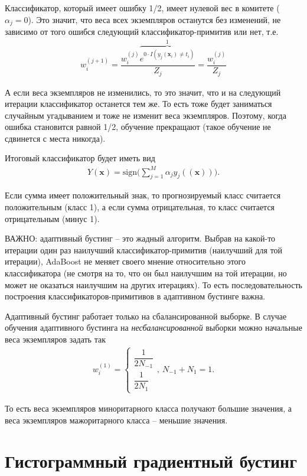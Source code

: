 \documentclass[%
	11pt,
	a4paper,
	utf8,
		]{article}
\begin{document}
Классификатор, который имеет ошибку 1/2, имеет нулевой вес в комитете ($ \alpha_j = 0 $). Это значит, что веса всех экземпляров останутся без изменений, не зависимо от того ошибся следующий классификатор-примитив или нет, т.е.
\begin{align*}
	w_i^{(j + 1)} = \dfrac{w_i^{(j)} \overbrace{e^{0\cdot I(y_j(\mathbf{x}_i) \neq t_i)}}^{1}}{Z_j} = \dfrac{ w_i^{(j)} }{Z_j}
\end{align*}

А если веса экземпляров не изменились, то это значит, что и на следующий итерации классификатор останется тем же. То есть тоже будет заниматься случайным угадыванием и тоже не изменит веса экземпляров. Поэтому, когда ошибка становится равной 1/2, обучение прекращают (такое обучение не сдвинется с места никогда).

Итоговый классификатор будет иметь вид
\begin{align*}
	Y(\mathbf{x}) = \text{sign} \Big( \sum_{j=1}^{M} \alpha_j y_j(\mathbf{(x)}) \Big).
\end{align*}

Если сумма имеет положительный знак, то прогнозируемый класс считается положительным (класс 1), а если сумма отрицательная, то класс считается отрицательным (минус 1).

ВАЖНО: адаптивный бустинг -- это жадный алгоритм. Выбрав на какой-то итерации один раз наилучший классификатор-примитив (наилучший для той итерации), AdaBoost не меняет своего мнение относительно этого классификатора (не смотря на то, что он был наилучшим на той итерации, но может не оказаться наилучшим на других итерациях). {\color{blue}То есть последовательность построения классификаторов-примитивов в адаптивном бустинге важна.}

Адаптивный бустинг работает только на сбалансированной выборке. В случае обучения адаптивного бустинга на \emph{несбалансированной} выборки можно начальные веса экземпляров задать так
\begin{align*}
	w_i^{(1)} = 
	\begin{cases}
		\dfrac{1}{2 N_{-1}}\\
		\dfrac{1}{ 2 N_{1}}
	\end{cases},\ N_{-1} + N_1 = 1.
\end{align*}

То есть веса экземпляров миноритарного класса получают большие значения, а веса экземпляров мажоритарного класса -- меньшие значения.


\section{Гистограммный градиентный бустинг}
\end{document}
